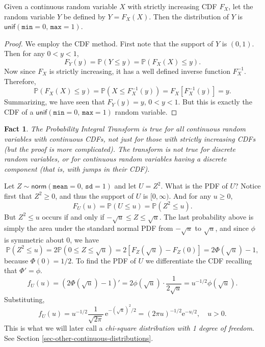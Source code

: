 \documentclass[]{book}
\numberwithin{equation}{chapter}
\numberwithin{figure}{chapter}
\theoremstyle{plain}
\newtheorem{fact}[thm]{Fact}
\theoremstyle{definition}
\theoremstyle{remark}
\theoremstyle{definition}
\theoremstyle{definition}
\theoremstyle{remark}
\let\BeginKnitrBlock\begin \let\EndKnitrBlock\end
\begin{document}
\bigskip

\BeginKnitrBlock{proposition}[The Probability Integral Transform]
\protect\hypertarget{prp:unnamed-chunk-279}{}{\label{prp:unnamed-chunk-279}
\iffalse (The Probability Integral Transform) \fi }Given a continuous
random variable \(X\) with strictly increasing CDF \(F_{X}\), let the
random variable \(Y\) be defined by \(Y=F_{X}(X)\). Then the
distribution of \(Y\) is
\(\mathsf{unif}(\mathtt{min}=0,\,\mathtt{max}=1)\).
\EndKnitrBlock{proposition}

\bigskip

\BeginKnitrBlock{proof}
\iffalse {Proof. } \fi We employ the CDF method. First note that the
support of \(Y\) is \((0,1)\). Then for any \(0<y<1\),
\[ F_{Y}(y)=\mathbb{P}(Y\leq
y)=\mathbb{P}(F_{X}(X)\leq y).  \] Now since \(F_{X}\) is strictly
increasing, it has a well defined inverse function \(F_{X}^{-1}\).
Therefore, \[ \mathbb{P}(F_{X}(X)\leq
y)=\mathbb{P}(X\leq F_{X}^{-1}(y))=F_{X}[F_{X}^{-1}(y)]=y.  \]
Summarizing, we have seen that \(F_{Y}(y)=y\), \(0<y<1\). But this is
exactly the CDF of a \(\mathsf{unif}(\mathtt{min}=0,\,\mathtt{max}=1)\)
random variable.
\EndKnitrBlock{proof}

\bigskip

\begin{fact}
The Probability Integral Transform is true for all continuous random
variables with continuous CDFs, not just for those with strictly
increasing CDFs (but the proof is more complicated). The transform is
\emph{not} true for discrete random variables, or for continuous random
variables having a discrete component (that is, with jumps in their
CDF).
\end{fact}

\bigskip

\BeginKnitrBlock{example}
\protect\hypertarget{ex:distn-of-z-squared}{}{\label{ex:distn-of-z-squared}}Let
\(Z\sim\mathsf{norm}(\mathtt{mean}=0,\,\mathtt{sd}=1)\) and let
\(U=Z^{2}\). What is the PDF of \(U\)? Notice first that \(Z^{2}\geq0\),
and thus the support of \(U\) is \([0,\infty)\). And for any \(u\geq0\),
\[ F_{U}(u)=\mathbb{P}(U\leq
u)=\mathbb{P}(Z^{2}\leq u).  \] But \(Z^{2}\leq u\) occurs if and only
if \(-\sqrt{u}\leq Z\leq\sqrt{u}\). The last probability above is simply
the area under the standard normal PDF from \(-\sqrt{u}\) to
\(\sqrt{u}\), and since \(\phi\) is symmetric about 0, we have \[
\mathbb{P}(Z^{2}\leq u)=2\mathbb{P}(0\leq
Z\leq\sqrt{u})=2\left[F_{Z}(\sqrt{u})-F_{Z}(0)\right]=2\Phi(\sqrt{u})-1,
\] because \(\Phi(0)=1/2\). To find the PDF of \(U\) we differentiate
the CDF recalling that \(\Phi'= \phi\). \[
f_{U}(u)=\left(2\Phi(\sqrt{u})-1\right)'=2\phi(\sqrt{u})\cdot\frac{1}{2\sqrt{u}}=u^{-1/2}\phi(\sqrt{u}).
\] Substituting, \[ f_{U}(u) =
u^{-1/2}\frac{1}{\sqrt{2\pi}}\,\mathrm{e}^{-(\sqrt{u})^{2}/2}=(2\pi
u)^{-1/2}\mathrm{e}^{-u/2},\quad u > 0.  \] This is what we will later
call a \emph{chi-square distribution with 1 degree of freedom}. See
Section \ref{sec-other-continuous-distributions}.
\EndKnitrBlock{example}
\end{document}
